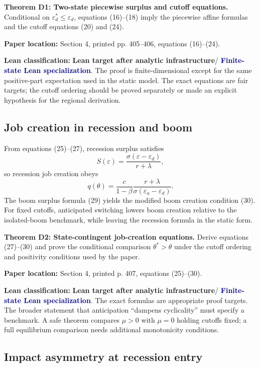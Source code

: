 \documentclass[11pt]{article}
\newcommand{\epsd}{\varepsilon_d}
\newcommand{\epsu}{\varepsilon_u}
\newcommand{\paperloc}[1]{\textbf{Paper location:} #1}
\newcommand{\leanclass}[1]{\textbf{Lean classification:} #1}
\newcommand{\infra}{\textcolor{darkAmber}{\textbf{Lean target after analytic infrastructure}}}
\newcommand{\finite}{\textcolor{navy}{\textbf{Finite-state Lean specialization}}}
\newcommand{\resultname}[1]{\medskip\noindent\textbf{#1.}}
\begin{document}
\resultname{Theorem D1: Two-state piecewise surplus and cutoff equations}
Conditional on $\epsd^*\le\epsd$, equations (16)--(18) imply the piecewise affine formulas and the cutoff equations (20) and (24).

\paperloc{Section 4, printed pp. 405--406, equations (16)--(24).}

\leanclass{\infra / \finite.}
The proof is finite-dimensional except for the same positive-part expectation used in the static model. The exact equations are fair targets; the cutoff ordering should be proved separately or made an explicit hypothesis for the regional derivation.

\subsection{Job creation in recession and boom}

From equations (25)--(27), recession surplus satisfies
\begin{equation}
 S(\varepsilon)=\frac{\sigma(\varepsilon-\epsd)}{r+\lambda}, \tag{27}
\end{equation}
so recession job creation obeys
\begin{equation}
 q(\theta)=\frac{c}{1-\beta}
 \frac{r+\lambda}{\sigma(\epsu-\epsd)}. \tag{28}
\end{equation}
The boom surplus formula (29) yields the modified boom creation condition (30). For fixed cutoffs, anticipated switching lowers boom creation relative to the isolated-boom benchmark, while leaving the recession formula in the static form.

\resultname{Theorem D2: State-contingent job-creation equations}
Derive equations (27)--(30) and prove the conditional comparison $\theta^*>\theta$ under the cutoff ordering and positivity conditions used by the paper.

\paperloc{Section 4, printed p. 407, equations (25)--(30).}

\leanclass{\infra / \finite.}
The exact formulas are appropriate proof targets. The broader statement that anticipation ``dampens cyclicality'' must specify a benchmark. A safe theorem compares $\mu>0$ with $\mu=0$ holding cutoffs fixed; a full equilibrium comparison needs additional monotonicity conditions.

\subsection{Impact asymmetry at recession entry}
\end{document}
